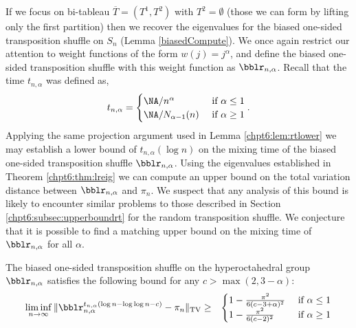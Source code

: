 \documentclass[11pt]{report}
\begin{document}
If we focus on bi-tableau $\overline{T} = (T^{1},T^{2})$ with $T^{2} = \emptyset$ (those we can form by lifting only the first partition) then we recover the eigenvalues for the biased one-sided transposition shuffle on $S_{n}$ (Lemma \ref{biasedCompute}). We once again restrict our attention to weight functions of the form $w(j) = j^{\alpha}$, and define the biased one-sided transposition shuffle with this weight function as $\bblr_{n,\alpha}$. Recall that the time $t_{n,\alpha}$ was defined as, 
\[t_{n,\alpha}= \begin{cases}
\NA/n^{\alpha} & \textnormal{ if } \alpha \leq 1 \\
\NA/N_{\alpha-1}(n) & \textnormal{ if } \alpha \geq 1 
\end{cases}. \]
Applying the same projection argument used in Lemma \ref{chpt6:lem:rtlower} we may establish a lower bound of $t_{n,\alpha} (\log n)$ on the mixing time of the biased one-sided transposition shuffle $\bblr_{n,\alpha}$. Using the eigenvalues established in Theorem \ref{chpt6:thm:lreig} we can compute an upper bound on the total variation distance between $\bblr_{n,\alpha}$ and $\pi_{n}$. We suspect that any analysis of this bound is likely to encounter similar problems to those described in Section \ref{chpt6:subsec:upperboundrt} for the random transposition shuffle. We conjecture that it is possible to find a matching upper bound on the mixing time of $\bblr_{n,\alpha}$ for all $\alpha$.

\begin{lemma}
	\label{chpt6:lem:ostlower}
	The biased one-sided transposition shuffle on the hyperoctahedral group $\bblr_{n,\alpha}$ satisfies the following bound for any $c >\max(2, 3-\alpha)$:
	\begin{eqnarray*}
		\liminf_{n\to\infty}\, \lVert 
		\bblr_{n,\alpha}^{t_{n,\alpha}\left(\log n - \log \log n - 
			c\right)} 
		-\pi_{n} \rVert_{\tiny \textnormal{TV}} & 
		\geq 
		& \begin{cases}
			1 - \frac{\pi^{2}}{6(c-3+\alpha)^{2}} & \textnormal{ if } \alpha 
			\leq 1 \\
			1 - \frac{\pi^{2}}{6(c-2)^{2}} & \textnormal{ if } \alpha \geq 1 
		\end{cases} 
	\end{eqnarray*}
\end{lemma}
\end{document}
